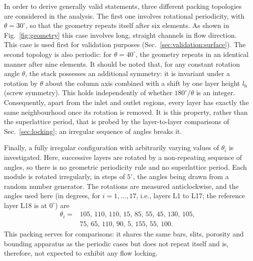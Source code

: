 In order to derive generally valid statements, three different packing topologies are considered in the analysis. The first one involves rotational periodicity, with $\theta=30^\circ$, so that the geometry repeats itself after six elements. As shown in Fig.~\ref{fig:geometry} this case involves long, straight channels in flow direction. This case is used first for validation purposes (Sec.~\ref{sec:validation:surface}).
The second topology is also periodic: for $\theta=40^\circ$, the geometry repeats in an identical manner after nine elements.
It should be noted that, for any constant rotation angle $\theta$, the stack possesses an additional symmetry: it is invariant under a rotation by $\theta$ about the column axis combined with a shift by one layer height $l_\mathrm{h}$ (screw symmetry). This holds independently of whether $180^\circ/\theta$ is an integer. Consequently, apart from the inlet and outlet regions, every layer has exactly the same neighbourhood once its rotation is removed. It is this property, rather than the superlattice period, that is probed by the layer-to-layer comparisons of Sec.~\ref{sec:locking}; an irregular sequence of angles breaks it.

Finally, a fully irregular configuration with arbitrarily varying values of $\theta_i$ is investigated. Here, successive layers are rotated by a non-repeating sequence of angles, so there is no geometric periodicity rule and no superlattice period. Each module is rotated irregularly, in steps of $5^\circ$, the angles being drawn from a random number generator. The rotations are measured anticlockwise, and the angles used here (in degrees, for $i=1,\ldots,17$, i.e., layers L1 to L17; the reference layer L18 is at $0^\circ$) are
\begin{equation}
\begin{aligned}
\theta_i = {}& 105,\,110,\,110,\,15,\,85,\,55,\,45,\,130,\,105,\\
& 75,\,65,\,110,\,90,\,5,\,155,\,55,\,100.
\end{aligned}
\end{equation}
This packing serves for comparisons: it shares the same bars, slits, porosity and bounding apparatus as the periodic cases but does not repeat itself and is, therefore, not expected to exhibit any flow locking.




